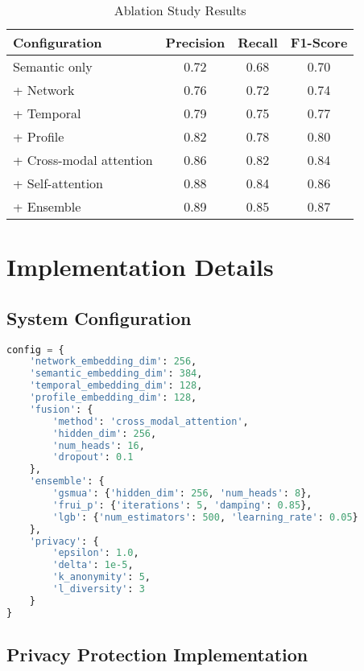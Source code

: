 \documentclass[conference]{IEEEtran}
\begin{document}
\begin{table}[htbp]
\caption{Ablation Study Results}
\begin{center}
\begin{tabular}{|l|c|c|c|}
\hline
\textbf{Configuration} & \textbf{Precision} & \textbf{Recall} & \textbf{F1-Score} \\
\hline
Semantic only & 0.72 & 0.68 & 0.70 \\
+ Network & 0.76 & 0.72 & 0.74 \\
+ Temporal & 0.79 & 0.75 & 0.77 \\
+ Profile & 0.82 & 0.78 & 0.80 \\
+ Cross-modal attention & 0.86 & 0.82 & 0.84 \\
+ Self-attention & 0.88 & 0.84 & 0.86 \\
+ Ensemble & 0.89 & 0.85 & 0.87 \\
\hline
\end{tabular}
\end{center}
\end{table}

\section{Implementation Details}

\subsection{System Configuration}

\begin{lstlisting}[language=Python, caption=System Configuration Example]
config = {
    'network_embedding_dim': 256,
    'semantic_embedding_dim': 384,
    'temporal_embedding_dim': 128,
    'profile_embedding_dim': 128,
    'fusion': {
        'method': 'cross_modal_attention',
        'hidden_dim': 256,
        'num_heads': 16,
        'dropout': 0.1
    },
    'ensemble': {
        'gsmua': {'hidden_dim': 256, 'num_heads': 8},
        'frui_p': {'iterations': 5, 'damping': 0.85},
        'lgb': {'num_estimators': 500, 'learning_rate': 0.05}
    },
    'privacy': {
        'epsilon': 1.0,
        'delta': 1e-5,
        'k_anonymity': 5,
        'l_diversity': 3
    }
}
\end{lstlisting}

\subsection{Privacy Protection Implementation}
\end{document}
